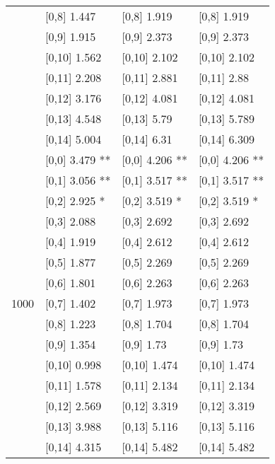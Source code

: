 \begin{table}
\begin{tabular}[t]{llll}
 & {}[0,8] 1.447 & {}[0,8] 1.919 & {}[0,8] 1.919\\
 & {}[0,9] 1.915 & {}[0,9] 2.373 & {}[0,9] 2.373\\
\addlinespace
 & {}[0,10] 1.562 & {}[0,10] 2.102 & {}[0,10] 2.102\\
 & {}[0,11] 2.208 & {}[0,11] 2.881 & {}[0,11] 2.88\\
 & {}[0,12] 3.176 & {}[0,12] 4.081 & {}[0,12] 4.081\\
 & {}[0,13] 4.548 & {}[0,13] 5.79 & {}[0,13] 5.789\\
 & {}[0,14] 5.004 & {}[0,14] 6.31 & {}[0,14] 6.309\\
\addlinespace
 & {}[0,0] 3.479 ** & {}[0,0] 4.206 ** & {}[0,0] 4.206 **\\
 & {}[0,1] 3.056 ** & {}[0,1] 3.517 ** & {}[0,1] 3.517 **\\
 & {}[0,2] 2.925 * & {}[0,2] 3.519 * & {}[0,2] 3.519 *\\
 & {}[0,3] 2.088 & {}[0,3] 2.692 & {}[0,3] 2.692\\
 & {}[0,4] 1.919 & {}[0,4] 2.612 & {}[0,4] 2.612\\
\addlinespace
 & {}[0,5] 1.877 & {}[0,5] 2.269 & {}[0,5] 2.269\\
 & {}[0,6] 1.801 & {}[0,6] 2.263 & {}[0,6] 2.263\\
1000 & {}[0,7] 1.402 & {}[0,7] 1.973 & {}[0,7] 1.973\\
 & {}[0,8] 1.223 & {}[0,8] 1.704 & {}[0,8] 1.704\\
 & {}[0,9] 1.354 & {}[0,9] 1.73 & {}[0,9] 1.73\\
\addlinespace
 & {}[0,10] 0.998 & {}[0,10] 1.474 & {}[0,10] 1.474\\
 & {}[0,11] 1.578 & {}[0,11] 2.134 & {}[0,11] 2.134\\
 & {}[0,12] 2.569 & {}[0,12] 3.319 & {}[0,12] 3.319\\
 & {}[0,13] 3.988 & {}[0,13] 5.116 & {}[0,13] 5.116\\
 & {}[0,14] 4.315 & {}[0,14] 5.482 & {}[0,14] 5.482\\
\bottomrule
\end{tabular}
\end{table}
